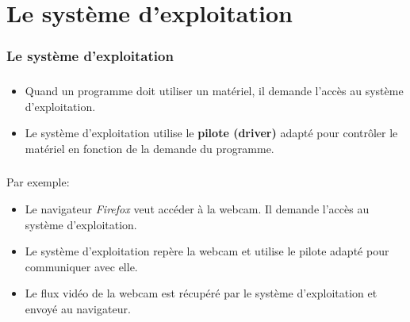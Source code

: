 \documentclass[svgnames,11pt]{beamer}
\begin{document}
\section{Le système d'exploitation}
\begin{frame}
    \frametitle{Le système d'exploitation}
\begin{center}
\end{center}

\end{frame}
\begin{frame}
    \frametitle{}

    \begin{aretenir}[]
        \begin{itemize}
            \item Quand un programme doit utiliser un matériel, il demande l'accès au système d'exploitation.
            \item Le système d'exploitation utilise le \textbf{pilote (driver)} adapté pour contrôler le matériel en fonction de la demande du programme.
        \end{itemize}
    \end{aretenir}

\end{frame}
\begin{frame}
    \frametitle{}
Par exemple:
    \begin{itemize}
        \item<1-> Le navigateur \emph{Firefox} veut accéder à la webcam. Il demande l'accès au système d'exploitation.
        \item <2-> Le système d'exploitation repère la webcam et utilise le pilote adapté pour communiquer avec elle.
        \item <3-> Le flux vidéo de la webcam est récupéré par le système d'exploitation et envoyé au navigateur.
    \end{itemize}

\end{frame}
\end{document}
